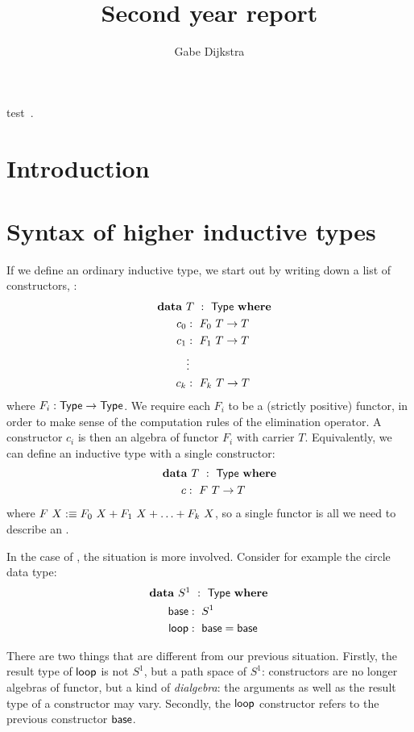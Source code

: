 \documentclass[a4paper,10pt]{article}
\title{Second year report}
\author{Gabe Dijkstra}
\begin{document}
\maketitle

test~\cite{UFP2013}.

\section{Introduction}
\label{sec:introduction}

\section{Syntax of higher inductive types}
\label{sec:syntax}

If we define an ordinary inductive type, we start out by writing down
a list of constructors, \eg:
%
\begin{alignat*}{2}
  &\rlap{$\data\ T\ :\ \Type\ \where$} \\
  &&\ \ c_0  &:\ F_0\ T \to T \\
  &&\ \ c_1  &:\ F_1\ T \to T \\
  &&\ \      &\vdots \\
  &&\ \ c_k  &:\ F_k\ T \to T
\end{alignat*}
%
where $F_i : \mathsf{Type} \to \mathsf{Type}$. We require each $F_i$ to be a (strictly
positive) functor, in order to make sense of the computation rules of
the elimination operator. A constructor $c_i$ is then an algebra of
functor $F_i$ with carrier $T$. Equivalently, we can define an
inductive type with a single constructor:
%
\begin{alignat*}{2}
  &\rlap{$\data\ T\ :\ \Type\ \where$} \\
  &&\ \ c &:\ F\ T \to T 
\end{alignat*}
%
where $F\ X :\equiv F_0\ X + F_1\ X + \hdots + F_k\ X$, so a single
functor is all we need to describe an \oit.

In the case of \hits, the situation is more involved. Consider for
example the circle data type:
%
\begin{alignat*}{2}
  &\rlap{$\data\ S^1\ :\ \Type\ \where$} \\
  &&\ \ \base     &:\ S^1 \\
  &&\ \ \loopcstr &:\ \base = \base
\end{alignat*}

There are two things that are different from our previous
situation. Firstly, the result type of $\mathsf{loop}$ is not $S^1$, but a path
space of $S^1$: constructors are no longer algebras of functor, but a
kind of \emph{dialgebra}: the arguments as well as the result type of
a constructor may vary. Secondly, the $\mathsf{loop}$ constructor refers to the
previous constructor $\mathsf{base}$.
\end{document}
